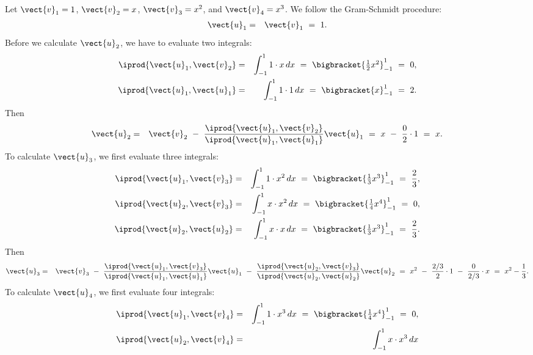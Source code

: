 \begin{solution}
  Let $\vect{v}_1=1$, $\vect{v}_2=x$, $\vect{v}_3=x^2$, and
  $\vect{v}_4=x^3$. We follow the Gram-Schmidt procedure:
  \begin{eqnarray*}
    \vect{u}_1
    &=& \vect{v}_1
        ~=~ 1.
  \end{eqnarray*}
  Before we calculate $\vect{u}_2$, we have to evaluate two integrals:
  \begin{eqnarray*}
    \iprod{\vect{u}_1,\vect{v}_2}
    &=& \int_{-1}^{1} 1\cdot x\,dx
    ~=~ \bigbracket{\textstyle\frac{1}{2}x^2}_{-1}^{1}
    ~=~ 0,
    \\
    \iprod{\vect{u}_1,\vect{u}_1}
    &=& \int_{-1}^{1} 1\cdot 1\,dx
    ~=~ \bigbracket{x}_{-1}^{1}
    ~=~ 2.
  \end{eqnarray*}
  Then
  \begin{eqnarray*}
    \vect{u}_2
    &=& \vect{v}_2 ~-~ \frac{\iprod{\vect{u}_1,\vect{v}_2}}{\iprod{\vect{u}_1,\vect{u}_1}}\vect{u}_1
    ~=~ x ~-~ \frac{0}{2}\cdot 1 ~=~ x.
  \end{eqnarray*}
  To calculate $\vect{u}_3$, we first evaluate three integrals:
  \begin{eqnarray*}
    \iprod{\vect{u}_1,\vect{v}_3}
    &=& \int_{-1}^{1} 1\cdot x^2\,dx
    ~=~ \bigbracket{\textstyle\frac{1}{3}x^3}_{-1}^{1}
    ~=~ \frac{2}{3},
    \\
    \iprod{\vect{u}_2,\vect{v}_3}
    &=& \int_{-1}^{1} x\cdot x^2\,dx
    ~=~ \bigbracket{\textstyle\frac{1}{4}x^4}_{-1}^{1}
    ~=~ 0,
    \\
    \iprod{\vect{u}_2,\vect{u}_2}
    &=& \int_{-1}^{1} x\cdot x\,dx
    ~=~ \bigbracket{\textstyle\frac{1}{3}x^3}_{-1}^{1}
    ~=~ \frac{2}{3}.
  \end{eqnarray*}
  Then
  \begin{eqnarray*}
    \vect{u}_3
    &=& \vect{v}_3
        ~-~ \frac{\iprod{\vect{u}_1,\vect{v}_3}}{\iprod{\vect{u}_1,\vect{u}_1}}\vect{u}_1
        ~-~ \frac{\iprod{\vect{u}_2,\vect{v}_3}}{\iprod{\vect{u}_2,\vect{u}_2}}\vect{u}_2
        ~=~ x^2 ~-~ \frac{2/3}{2}\cdot 1 ~-~ \frac{0}{2/3}\cdot x
        ~=~ x^2 - \frac{1}{3}.
  \end{eqnarray*}
  To calculate $\vect{u}_4$, we first evaluate four integrals:
  \begin{eqnarray*}
    \iprod{\vect{u}_1,\vect{v}_4}
    &=& \int_{-1}^{1} 1\cdot x^3\,dx
    ~=~ \bigbracket{\textstyle\frac{1}{4}x^4}_{-1}^{1}
    ~=~ 0,
    \\
    \iprod{\vect{u}_2,\vect{v}_4}
    &=& \int_{-1}^{1} x\cdot x^3\,dx

\end{eqnarray*}
\end{solution}
